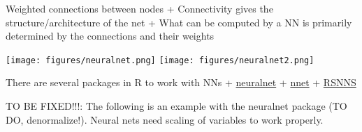 \documentclass[
]{book}
\newenvironment{Shaded}{\begin{snugshade}}{\end{snugshade}}
\newcommand{\FunctionTok}[1]{\textcolor[rgb]{0.00,0.00,0.00}{#1}}
\newcommand{\NormalTok}[1]{#1}
\newcommand{\OtherTok}[1]{\textcolor[rgb]{0.56,0.35,0.01}{#1}}
\newcommand{\SpecialCharTok}[1]{\textcolor[rgb]{0.00,0.00,0.00}{#1}}
\newcommand{\StringTok}[1]{\textcolor[rgb]{0.31,0.60,0.02}{#1}}
\begin{document}
Weighted connections between nodes
+ Connectivity gives the structure/architecture of the net
+ What can be computed by a NN is primarily determined by the connections and their weights

\texttt{[image: figures/neuralnet.png]}
\texttt{[image: figures/neuralnet2.png]}

There are several packages in R to work with NNs
+ \href{https://cran.r-project.org/web/packages/neuralnet/index.html}{neuralnet}
+ \href{https://cran.r-project.org/web/packages/nnet/index.html}{nnet}
+ \href{https://cran.r-project.org/web/packages/RSNNS/index.html}{RSNNS}

TO BE FIXED!!!: The following is an example with the neuralnet package (TO DO, denormalize!). Neural nets need scaling of variables to work properly.

\begin{Shaded}
\end{Shaded}
\end{document}
